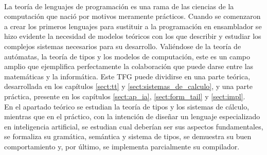 \chapter*{}


%


\newpage
\thispagestyle{empty}

\begin{center}
{\large\bfseries \myOfficialTitle}\\
\end{center}
\begin{center}
\myName\\
\end{center}

\\

\vspace{0.7cm}
\\

La teoría de lenguajes de programación es una rama de las ciencias de la computación que nació por motivos meramente prácticos. Cuando se comenzaron a crear los primeros lenguajes para sustituir a la programación en ensamblador se hizo evidente la necesidad de modelos teóricos con los que describir y estudiar los complejos sistemas necesarios para su desarrollo. Valiéndose de la teoría de autómatas, la teoría de tipos y los modelos de computación, este es un campo amplio que ejemplifica perfectamente la colaboración que puede darse entre las matemáticas y la informática. Este TFG puede dividirse en una parte teórica, desarrollada en los capítulos \ref{sect:tt} y \ref{sect:sistemas_de_calculo}, y una parte práctica, presente en los capítulos \ref{sect:ap_ia}, \ref{sect:form_tail} y \ref{sect:impl}.\\

En el apartado teórico se estudian la teoría de tipos y los sistemas de cálculo, mientras que en el práctico, con la intención de diseñar un lenguaje especializado en inteligencia artificial, se estudian cual deberían ser sus aspectos fundamentales, se formaliza su gramática, semántica y sistema de tipos, se demuestra su buen comportamiento y, por último, se implementa parcialmente su compilador.\\
\cleardoublepage


\thispagestyle{empty}


